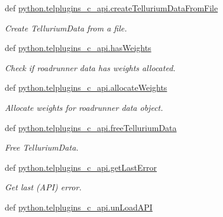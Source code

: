 \begin{DoxyCompactItemize}
def \hyperlink{group__utilities_ga931e8c1ce301769e2aa197c7bc25df82}{python.\-telplugins\-\_\-c\-\_\-api.\-create\-Tellurium\-Data\-From\-File}
\begin{DoxyCompactList}\small\item\em Create Tellurium\-Data from a file. \end{DoxyCompactList}\item 
def \hyperlink{group__utilities_ga85ee644c13a921ba344f2a009b20a486}{python.\-telplugins\-\_\-c\-\_\-api.\-has\-Weights}
\begin{DoxyCompactList}\small\item\em Check if roadrunner data has weights allocated. \end{DoxyCompactList}\item 
def \hyperlink{group__utilities_ga80b1c2c6039a9dadb1a2f67a90c24718}{python.\-telplugins\-\_\-c\-\_\-api.\-allocate\-Weights}
\begin{DoxyCompactList}\small\item\em Allocate weights for roadrunner data object. \end{DoxyCompactList}\item 
def \hyperlink{group__utilities_ga68111c5048f3bbc93e279daf89cd9fc7}{python.\-telplugins\-\_\-c\-\_\-api.\-free\-Tellurium\-Data}
\begin{DoxyCompactList}\small\item\em Free Tellurium\-Data. \end{DoxyCompactList}\item 
def \hyperlink{group__utilities_gab4070842611cfaf3c35b0dc62b909e31}{python.\-telplugins\-\_\-c\-\_\-api.\-get\-Last\-Error}
\begin{DoxyCompactList}\small\item\em Get last (A\-P\-I) error. \end{DoxyCompactList}\item 
\hypertarget{group__utilities_gaead0a90f80923a66153dbdf974d4cde7}{def \hyperlink{group__utilities_gaead0a90f80923a66153dbdf974d4cde7}{python.\-telplugins\-\_\-c\-\_\-api.\-un\-Load\-A\-P\-I}}\label{group__utilities_gaead0a90f80923a66153dbdf974d4cde7}


\end{DoxyCompactItemize}
